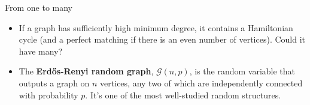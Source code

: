\documentclass{beamer}
\theoremstyle{plain}
\newcommand{\E}{\mathbb{E}}
\begin{document}
	\begin{frame}{From one to many}
		\begin{itemize}
			\item If a graph has sufficiently high minimum degree, it contains a Hamiltonian cycle (and a perfect matching if there is an even number of vertices).
			Could it have many?

			\pause

			\item The \textbf{Erd\H{o}s-Renyi random graph}, $\mathcal{G}(n, p)$, is the random variable that outputs a graph on $n$ vertices, any two of which are independently connected with probability $p$.
			It's one of the most well-studied random structures.

			




		\end{itemize}
	\end{frame}



\end{document}
